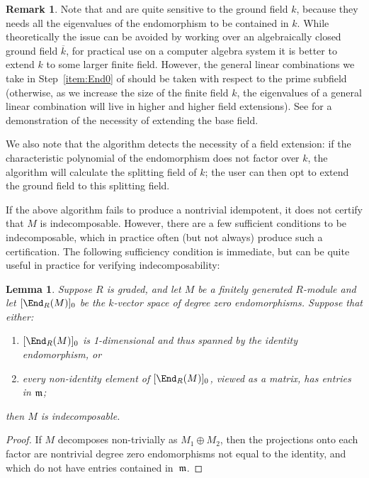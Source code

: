 \documentclass[12pt]{article}
\let\bar\overline
\theoremstyle{theorem}
\numberwithin{thm}{section}
\newtheorem{lem}[thm]{Lemma}
\theoremstyle{definition}
\newtheorem{rem}[thm]{Remark}
\begin{document}
\begin{rem}
  Note that 
 and  are 
 quite sensitive to the ground field $k$, because they needs all the eigenvalues of the endomorphism 
to be contained in $k$. While theoretically the issue can be avoided by working over an algebraically closed ground field $\bar k$, for practical use on a computer algebra system it is better to extend $k$ to some larger finite field. However, the general linear combinations we take in Step~\ref{item:End0} of  should be taken with respect to the prime subfield (otherwise, as we increase the size of the finite field $k$, the eigenvalues of a general linear combination will live in higher and higher field extensions).
  See  for a demonstration of the necessity of extending the base field.

We also note that the algorithm detects the necessity of a field extension: if the characteristic polynomial of the endomorphism does not factor over $k$, the algorithm will calculate the splitting field of $k$; the user can then opt to extend the ground field to this splitting field.
\end{rem}

If the above algorithm fails to produce a nontrivial idempotent, it does not certify that $M$ is indecomposable. However, there are a few sufficient conditions to be indecomposable, which in practice often (but not always) produce such a certification.
The following sufficiency condition is immediate, but can be quite useful in practice for verifying indecomposability:

\begin{lem}
  Suppose $R$ is graded, and let $M$ be a finitely generated $R$-module and let $[\End_R(M)]_0$ be the $k$-vector space of degree zero endomorphisms. Suppose that either:
  \begin{enumerate}
  \item $[\End_R(M)]_0$ is 1-dimensional and thus spanned by the identity endomorphism, or
  \item every non-identity element of $[\End_R(M)]_0$, viewed as a matrix, has entries in $\mathfrak m$;
  \end{enumerate}
  then $M$ is indecomposable.
\end{lem}

\begin{proof}
  If $M$ decomposes non-trivially as $M_1\oplus M_2$, then the projections onto each factor are nontrivial degree zero endomorphisms not equal to the identity, and which do not have entries contained in~$\mathfrak m$.
\end{proof}
\end{document}
